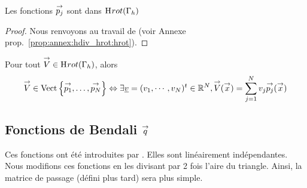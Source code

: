     \begin{prop}
      Les fonctions \({\overset{\rightarrow}{p_j}}\) sont dans \(\mathrm{H}_\mathrm{{}}{rot}(\Gamma_h)\)
    \end{prop}
    \begin{proof}
      Nous renvoyons au travail de \cite{nedelec_mixed_1980} (voir Annexe prop.~\ref{prop:annex:hdiv_hrot:hrot}).
    \end{proof}


    \begin{defn}
      Pour tout \({\overset{\rightarrow}{V}} \in \mathrm{H}_\mathrm{{}}{rot}(\Gamma_h)\), alors
      \begin{equation*}
        {\overset{\rightarrow}{V}} \in \operatorname{Vect}\left\lbrace{\overset{\rightarrow}{p_1}},\ldots,{\overset{\rightarrow}{p_N}}\right\rbrace \Leftrightarrow \exists {\underline{v}} = (v_1,\cdots,v_N)^t \in \mathbb R^N, {\overset{\rightarrow}{V}}({\overset{\rightarrow}{x}}) = \sum_{j=1}^N v_j {\overset{\rightarrow}{p_j}}({\overset{\rightarrow}{x}})
      \end{equation*}
    \end{defn}

  \subsection[Fonctions de Bendali q]{Fonctions de Bendali \({\overset{\rightarrow}{q}}\)}

    Ces fonctions ont été introduites par \cite[eq.~28]{bendali_boundary-element_1999}. Elles sont linéairement indépendantes. Nous modifions ces fonctions en les divisant par 2 fois l'aire du triangle. Ainsi, la matrice de passage (défini plus tard) sera plus simple.


